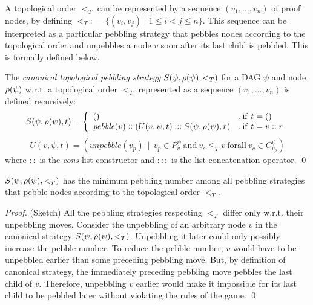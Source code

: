 \documentclass{llncs}
\newcommand{\defeq}{\mathrel{\mathop:}=}
\newcommand{\Premises}[2]{P_{#1}^{#2}}
\newcommand{\Children}[2]{C_{#1}^{#2}}
\begin{document}
\noindent
A topological order $<_T$ can be represented by a sequence $(v_1,\dots,v_n)$ of proof nodes, by defining $<_T \defeq \{(v_i,v_j) \mid 1 \leq i < j \leq n\}$. This sequence can be interpreted as a particular pebbling strategy that pebbles nodes according to the topological order and unpebbles a node $v$ soon after its last child is pebbled. This is formally defined below.

\newcommand{\cstrategy}[3]{S(#1,#2,#3)}

\begin{definition}
The \emph{canonical topological pebbling strategy} $\cstrategy{\psi}{\raiz{\psi}}{<_T}$ for a DAG $\psi$ and node $\rho(\psi)$ w.r.t. a topological order $<_T$ represented as a sequence $(v_1,\dots,v_n)$ is defined recursively:
$$
\cstrategy{\psi}{\raiz{\psi}}{t} = \left\{\begin{array}{ll}  
                 () & , \mathrm{if } \ t = () \\
                 \mathit{pebble}(v)::(U(v, \psi, t):::\cstrategy{\psi}{\raiz{\psi}}{r} & , \mathrm{if } \ t = v::r 
               \end{array}\right.
$$
$$
U(v, \psi, t) = (\mathit{unpebble}(v_p) \ \  | \ \ v_p \in \Premises{v}{\psi} \ \mathrm{and} \ v_c \leq_T v \ \mathrm{for all} \ v_c \in \Children{v_p}{\psi})
$$
%
where $::$ is the \emph{cons} list constructor and $:::$ is the list concatenation operator.
\qed
\end{definition}

\begin{theorem}
\label{theorem:canonical}
$\cstrategy{\psi}{\raiz{\psi}}{<_T}$ has the minimum pebbling number among all pebbling strategies that pebble nodes according to the topological order $<_T$.
\end{theorem}
\begin{proof} (Sketch)
All the pebbling strategies respecting $<_T$ differ only w.r.t. their unpebbling moves.
Consider the unpebbling of an arbitrary node $v$ in the canonical strategy $\cstrategy{\psi}{\raiz{\psi}}{<_T}$. Unpebbling it later could only possibly increase the pebble number. To reduce the pebble number, $v$ would have to be unpebbled earlier than some preceding pebbling move. But, by definition of canonical strategy, the immediately preceding pebbling move pebbles the last child of $v$. Therefore, unpebbling $v$ earlier would make it impossible for its last child to be pebbled later without violating the rules of the game.
\qed
\end{proof}
\end{document}
